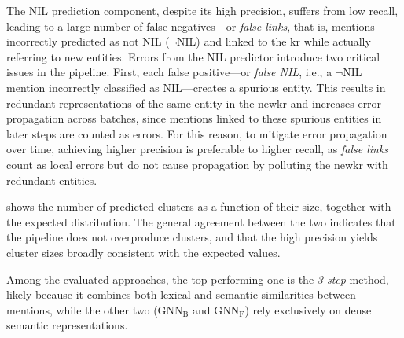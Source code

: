 The NIL prediction component, despite its high precision, suffers from low recall, leading to a large number of false negatives---or \emph{false links}, that is, mentions incorrectly predicted as not NIL ($\neg$NIL) and linked to the \ac{kr} while actually referring to new entities.
Errors from the NIL predictor introduce two critical issues in the pipeline.
First, each false positive---or \emph{false NIL}, i.e., a $\neg$NIL mention incorrectly classified as NIL---creates a spurious entity.
This results in redundant representations of the same entity in the \ac{newkr} and increases error propagation across batches, since mentions linked to these spurious entities in later steps are counted as errors.
For this reason, to mitigate error propagation over time, achieving higher precision is preferable to higher recall, as \emph{false links} count as local errors but do not cause propagation by polluting the \ac{newkr} with redundant entities.

 shows the number of predicted clusters as a function of their size, together with the expected distribution. 
The general agreement between the two indicates that the pipeline does not overproduce clusters, and that the high precision yields cluster sizes broadly consistent with the expected values.



Among the evaluated approaches, the top-performing one is the \textit{3-step} method, likely because it combines both lexical and semantic similarities between mentions, while the other two ($\text{GNN}_\text{B}$ and $\text{GNN}_\text{F}$) rely exclusively on dense semantic representations.





